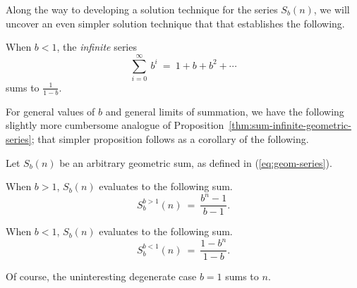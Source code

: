 Along the way to developing a solution technique for the series
$S_{b}(n)$, we will uncover an even simpler solution
technique that that establishes the following.

\begin{prop}
\label{thm:sum-infinite-geometric-series}
When $b < 1$,  the {\em infinite} series
\[ \sum_{i=0}^\infty \ b^i \ = \ 1 + b + b^2 + \cdots \]
sums to $\displaystyle \frac{1}{1-b}$.
\end{prop}

\bigskip

For general values of $b$ and general limits of summation, we have the
following slightly more cumbersome analogue of
Proposition~\ref{thm:sum-infinite-geometric-series}; that simpler
proposition follows as a corollary of the following.

\begin{prop}
\label{thm:sum-finite-geometric-series}
Let $S_{b}(n)$ be an arbitrary geometric sum, as defined in
(\ref{eq:geom-series}).

When $b > 1$, $S_{b}(n)$ evaluates to the following sum.
\begin{equation}
\label{eq:geom-sum:b>1}
S^{b>1}_{b}(n) \ = \ \frac{b^{n}- 1}{b - 1}.
\end{equation}

When $b < 1$, $S_{b}(n)$ evaluates to the following sum.
\begin{equation}
\label{eq:geom-sum:b<1}
S^{b<1}_{b}(n) \ = \ \frac{1 - b^n}{1-b}.
\end{equation}
\end{prop}

Of course, the uninteresting degenerate case $b=1$ sums to $n$.

